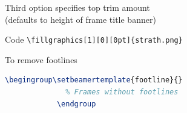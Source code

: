 \documentclass[aspectratio=169]{beamer}
\begin{document}
\begingroup{}
\begin{frame}[fragile]
	\begin{block}{}
		Third option specifies top trim amount\\
		(defaults to height of frame title banner)
	\end{block}
	\begin{exampleblock}{Code}
		\verb|\fillgraphics[1][0][0pt]{strath.png}|
	\end{exampleblock}
	\begin{alertblock}{To remove footlines}
		\begin{lstlisting}[language=TeX, gobble=3, tabsize=1]
			\begingroup\setbeamertemplate{footline}{}
			  % Frames without footlines
			\endgroup
		\end{lstlisting}
	\end{alertblock}
\end{frame}
\endgroup
\end{document}
